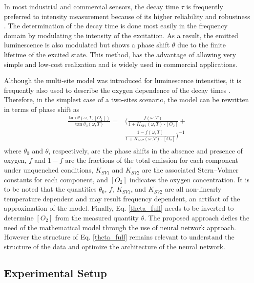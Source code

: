 \documentclass[9pt,twocolumn,twoside,pdftex]{optica}
\begin{document}
In most industrial and commercial sensors, the decay time $\tau$ is frequently preferred to intensity measurement because of its higher reliability and robustness \cite{Wei2019}. The determination of the decay time is done most easily in the frequency domain by modulating the intensity of the excitation.  As a result, the emitted luminescence is also modulated but shows a phase shift $\theta$ due to the finite lifetime of the excited state. This method, has the advantage of allowing very simple and low-cost realization and is widely used in commercial applications.

Although the multi-site model was introduced for luminescence intensities, it is frequently also used to describe the oxygen dependence of the decay times \cite{Demas1995,Quaranta2012}. Therefore, in the simplest case of a two-sites scenario, the model can be rewritten in terms of phase shift as \cite{Michelucci2019}
\begin{equation}
\begin{aligned}
\frac{\tan \theta (\omega, T, [O_2])}{\tan \theta_0 (\omega, T)} =& \bigg( \frac{f (\omega , T) }{1+K_{SV1} (\omega , T) \cdot \left[O_2\right]}+ \\
&\frac{1-f (\omega , T) }{1+K_{SV2} (\omega , T) \cdot \left[O_2\right]} \bigg)^{-1} \\
\label{theta_full}
\end{aligned}
\end{equation}
where $\theta_0$ and $\theta$, respectively, are the phase shifts in the absence and presence of oxygen, $f$ and $1-f$ are the fractions of the total emission for each component under unquenched conditions, $K_{SV1}$ and $K_{SV2}$ are the associated Stern–Volmer constants for each component, and $\left[O_2\right]$ indicates the oxygen concentration. It is to be noted that the quantities $\theta_0$, $f$, $K_{SV1}$, and $K_{SV2}$ are all non-linearly temperature dependent \cite{Ogurtsov2006,lo2008,Zaitsev2016} and may result frequency dependent, an artifact of the approximation of the model. Finally, Eq. \ref{theta_full} needs to be inverted to determine $[O_2]$ from the measured quantity $\theta$. The proposed approach defies the need of the mathematical model through the use of neural network approach. However the structure of Eq. \ref{theta_full} remains relevant to understand the structure of the data and optimize the architecture of the neural network.


\subsection{Experimental Setup}
\label{Experimental}
\end{document}
